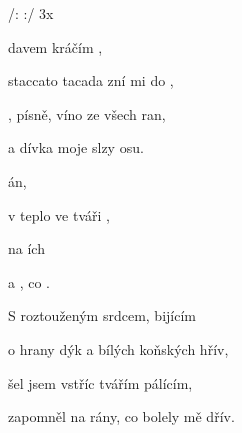 

/:     :/ 3x

\zs
{} davem kráčím ,

staccato tacada zní mi do ,

, písně, víno ze všech ran,

a dívka  moje slzy osu.
\ks

\zr
{} án,

v  teplo  ve tváři ,

na ích  

a , co  .
\kr

\zs
S roztouženým srdcem, bijícím

o hrany dýk a bílých koňských hřív,

šel jsem vstříc tvářím pálícím,

zapomněl na rány, co bolely mě dřív.

\ks

\kp






